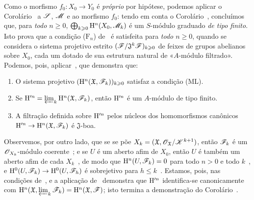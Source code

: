 Como o morfismo $f_0:X_0\to Y_0$ é \emph{próprio} por hipótese, podemos aplicar o Corolário~ a $\mathscr{S}$, $\mathscr{M}$ e ao morfismo $f_0$: tendo em conta o Corolário~, concluímos que, para \emph{todo $n\geq 0$}, $\bigoplus_{k\geqslant 0}\mathrm{H}^n(X_0,\mathscr{M}_k)$ é um $S$-módulo graduado \emph{de tipo finito}.
Isto prova que a condição ($\text{F}_n$) de~ é satisfeita para \emph{todo $n\geq 0$}, quando se considera o sistema projetivo estrito $(\mathscr{F}/\mathfrak{J}^k\mathscr{F})_{k\geqslant 0}$ de feixes de grupos abelianos sobre $X_0$, cada um dotado de sua estrutura natural de «$A$-módulo filtrado».
Podemos, pois, aplicar~, que demonstra que:
\begin{enumerate}
  \item[1.º] O sistema projetivo $(\mathrm{H}^n(\mathfrak{X},\mathscr{F}_k))_{k\geqslant 0}$ satisfaz a condição (ML).
  \item[2.º] Se $\mathrm{H}^{\prime n}=\varprojlim_k\mathrm{H}^n(\mathfrak{X},\mathscr{F}_k)$, então $\mathrm{H}^{\prime n}$ é um $A$-módulo de tipo finito.
  \item[3.º] A filtração definida sobre $\mathrm{H}^{\prime n}$ pelos núcleos dos homomorfismos canônicos $\HH^{\prime n}\to\HH^n(\mathfrak{X},\sh{F}_k)$ é $\mathfrak{J}$-boa.
\end{enumerate}

Observemos, por outro lado, que se se põe $X_k=(\mathfrak{X},\mathscr{O}_\mathfrak{X}/\mathscr{K}^{k+1})$, então $\mathscr{F}_k$ é um $\mathscr{O}_{X_k}$-módulo coerente~; e se $U$ é um aberto afim de $X_0$, então $U$ é também um aberto afim de cada $X_k$~, de modo que $\mathrm{H}^n(U,\mathscr{F}_k)=0$ para todo $n>0$ e todo $k$~, e $\HH^0(U,\sh{F}_k)\to\HH^0(U,\sh{F}_h)$ é sobrejetivo para $h\leq k$~.
Estamos, pois, nas condições de~, e a aplicação de~ demonstra que $\mathrm{H}^{\prime n}$ identifica-se canonicamente com $\mathrm{H}^n(\mathfrak{X},\varprojlim_k\mathscr{F}_k)=\mathrm{H}^n(\mathfrak{X},\mathscr{F})$; isto termina a demonstração do Corolário~.

